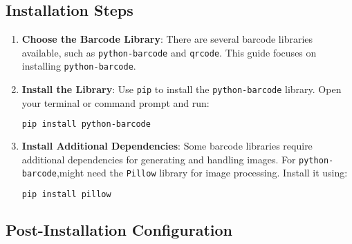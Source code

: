 \subsection*{Installation Steps}

\begin{enumerate}
	\item \textbf{Choose the Barcode Library}: There are several barcode libraries available, such as \texttt{python-barcode} and \texttt{qrcode}. This guide focuses on installing \texttt{python-barcode}.
	
	\item \textbf{Install the Library}: Use \texttt{pip} to install the \texttt{python-barcode} library. Open your terminal or command prompt and run:
	\begin{lstlisting}[language=bash]
		pip install python-barcode
	\end{lstlisting}
	
	\item \textbf{Install Additional Dependencies}: Some barcode libraries require additional dependencies for generating and handling images. For \texttt{python-barcode},might need the \texttt{Pillow} library for image processing. Install it using:
	\begin{lstlisting}[language=bash]
		pip install pillow
	\end{lstlisting}
\end{enumerate}

\subsection*{Post-Installation Configuration}

